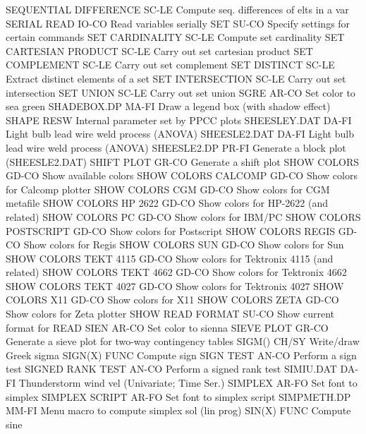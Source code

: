 SEQUENTIAL DIFFERENCE       SC-LE Compute seq. differences of elts in a var
SERIAL READ                 IO-CO Read variables serially
SET                         SU-CO Specify settings for certain commands
SET CARDINALITY             SC-LE Compute set cardinality
SET CARTESIAN PRODUCT       SC-LE Carry out set cartesian product
SET COMPLEMENT              SC-LE Carry out set complement
SET DISTINCT                SC-LE Extract distinct elements of a set
SET INTERSECTION            SC-LE Carry out set intersection
SET UNION                   SC-LE Carry out set union
SGRE                        AR-CO Set color to sea green
SHADEBOX.DP                 MA-FI Draw a legend box (with shadow effect)
SHAPE                       RESW  Internal parameter set by PPCC plots
SHEESLEY.DAT                DA-FI Light bulb lead wire weld process (ANOVA)
SHEESLE2.DAT                DA-FI Light bulb lead wire weld process (ANOVA)
SHEESLE2.DP                 PR-FI Generate a block plot (SHEESLE2.DAT)
SHIFT PLOT                  GR-CO Generate a shift plot
SHOW COLORS                 GD-CO Show available colors
SHOW COLORS CALCOMP         GD-CO Show colors for Calcomp plotter
SHOW COLORS CGM             GD-CO Show colors for CGM metafile
SHOW COLORS HP 2622         GD-CO Show colors for HP-2622 (and related)
SHOW COLORS PC              GD-CO Show colors for IBM/PC
SHOW COLORS POSTSCRIPT      GD-CO Show colors for Postscript
SHOW COLORS REGIS           GD-CO Show colors for Regis
SHOW COLORS SUN             GD-CO Show colors for Sun
SHOW COLORS TEKT 4115       GD-CO Show colors for Tektronix 4115 (and related)
SHOW COLORS TEKT 4662       GD-CO Show colors for Tektronix 4662
SHOW COLORS TEKT 4027       GD-CO Show colors for Tektronix 4027
SHOW COLORS X11             GD-CO Show colors for X11
SHOW COLORS ZETA            GD-CO Show colors for Zeta plotter
SHOW READ FORMAT            SU-CO Show current format for READ
SIEN                        AR-CO Set color to sienna
SIEVE PLOT                  GR-CO Generate a sieve plot for two-way contingency tables
SIGM()                      CH/SY Write/draw Greek sigma
SIGN(X)                     FUNC  Compute sign
SIGN TEST                   AN-CO Perform a sign test
SIGNED RANK TEST            AN-CO Perform a signed rank test
SIMIU.DAT                   DA-FI Thunderstorm wind vel (Univariate; Time Ser.)
SIMPLEX                     AR-FO Set font to simplex
SIMPLEX SCRIPT              AR-FO Set font to simplex script
SIMPMETH.DP                 MM-FI Menu macro to compute simplex sol (lin prog)
SIN(X)                      FUNC  Compute sine
